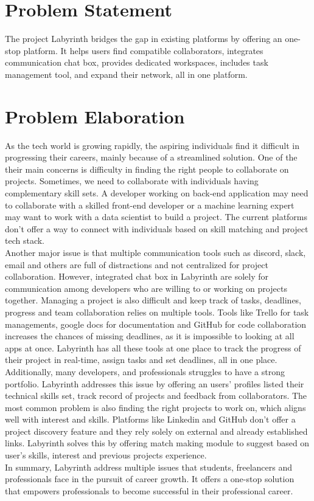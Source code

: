 \documentclass{FastFyp}
\begin{document}
\section{Problem Statement}
The project Labyrinth bridges the gap in existing platforms by offering an one-stop platform. It helps users find compatible collaborators, integrates communication chat box, provides dedicated workspaces, includes task management tool, and expand their network, all in one platform.
\section{Problem Elaboration}
As the tech world is growing rapidly, the aspiring individuals find it difficult in progressing their careers, mainly because of a streamlined solution. One of the their main concerns is difficulty in finding the right people to collaborate on projects. Sometimes, we need to collaborate with individuals having complementary skill sets. A developer working on back-end application may need to collaborate with a skilled front-end developer or a machine learning expert may want to work with a data scientist to build a project. The current platforms don't offer a way to connect with individuals based on skill matching and project tech stack. \\
Another major issue is that multiple communication tools such as discord, slack, email and others are full of distractions and not centralized for project collaboration. However, integrated chat box in Labyrinth are solely for communication among developers who are willing to or working on projects together.
Managing a project is also difficult and keep track of tasks, deadlines, progress and team collaboration relies on multiple tools. Tools like Trello for task managements, google docs for documentation and GitHub for code collaboration increases the chances of missing deadlines, as it is impossible to looking at all apps at once. Labyrinth has all these tools at one place to track the progress of their project in real-time, assign tasks and set deadlines, all in one place. \\
Additionally, many developers, and professionals struggles to have a strong portfolio. Labyrinth addresses this issue by offering an users' profiles listed their technical skills set, track record of projects and feedback from collaborators. The most common problem is also finding the right projects to work on, which aligns well with interest and skills. Platforms like Linkedin and GitHub don't offer a project discovery feature and they rely solely on external and already established links. Labyrinth solves this by offering match making module to suggest based on user's skills, interest and previous projects experience. \\
In summary, Labyrinth address multiple issues that students, freelancers and professionals face in the pursuit of career growth. It offers a one-stop solution that empowers professionals to become successful in their professional career.
\end{document}

